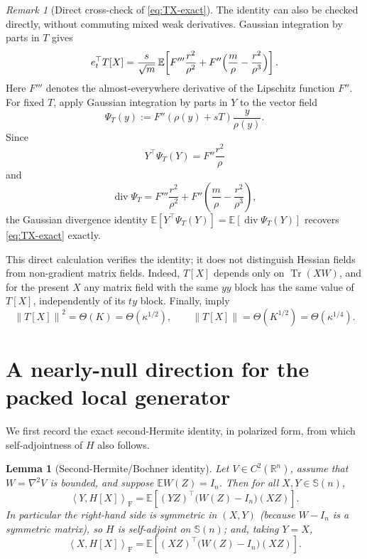 \documentclass[11pt]{article}
\theoremstyle{plain}
\newtheorem{lemma}[theorem]{Lemma}
\theoremstyle{definition}
\theoremstyle{remark}
\newtheorem{remark}[theorem]{Remark}
\newcommand{\R}{\mathbb{R}}
\newcommand{\E}{\mathbb{E}}
\newcommand{\Sym}{\mathbb{S}}
\newcommand{\Tr}{\operatorname{Tr}}
\newcommand{\Id}{I}
\newcommand{\1}{\mathbf{1}}
\newcommand{\norm}[1]{\left\lVert #1\right\rVert}
\newcommand{\inner}[2]{\left\langle #1,#2\right\rangle}
\begin{document}
\begin{remark}[Direct cross-check of \eqref{eq:TX-exact}]
\label{rem:crosscheck}
The identity can also be checked directly, without commuting mixed weak
derivatives. Gaussian integration by parts in $T$ gives
\[
    e_t^\top T[X]
    =\frac{s}{\sqrt m}\,
    \E\!\left[F'''\frac{r^2}{\rho^2}
        +F''\Bigl(\frac m\rho-\frac{r^2}{\rho^3}\Bigr)\right].
\]
Here $F'''$ denotes the almost-everywhere derivative of the Lipschitz
function $F''$. For fixed $T$, apply Gaussian integration by parts in $Y$
to the vector field
\[
    \Psi_T(y)
    :=
    F''(\rho(y)+sT)\frac{y}{\rho(y)}.
\]
Since
\[
    Y^\top\Psi_T(Y)=F''\frac{r^2}{\rho}
\]
and
\[
    \operatorname{div}\Psi_T
    =
    F'''\frac{r^2}{\rho^2}
    +
    F''\left(\frac m\rho-\frac{r^2}{\rho^3}\right),
\]
the Gaussian divergence identity
$\E[Y^\top\Psi_T(Y)]=\E[\operatorname{div}\Psi_T(Y)]$ recovers
\eqref{eq:TX-exact} exactly.

This direct calculation verifies the identity; it does not distinguish
Hessian fields from non-gradient matrix fields. Indeed, $T[X]$ depends only
on $\Tr(XW)$, and for the present $X$ any matrix field with the same $yy$
block has the same value of $T[X]$, independently of its $ty$ block. Finally,
 imply
\[
    \norm{T[X]}^2=\Theta(K)=\Theta(\kappa^{1/2}),
    \qquad
    \norm{T[X]}=\Theta(K^{1/2})=\Theta(\kappa^{1/4}).
\]
\end{remark}

\section{A nearly-null direction for the packed local generator}
\label{sec:gap}

We first record the exact second-Hermite identity, in polarized form, from
which self-adjointness of $H$ also follows.

\begin{lemma}[Second-Hermite/Bochner identity]
\label{lem:second-Hermite}
Let $V\in C^2(\R^n)$, assume that $W=\nabla^2V$ is bounded, and suppose
$\E W(Z)=\Id_n$. Then for all $X,Y\in\Sym(n)$,
\begin{equation}
    \inner{Y}{H[X]}_{\mathrm F}
    =
    \E\!\left[
        (YZ)^\top\bigl(W(Z)-\Id_n\bigr)(XZ)
    \right].
    \label{eq:second-Hermite-id}
\end{equation}
In particular the right-hand side is symmetric in $(X,Y)$ (because $W-\Id_n$
is a symmetric matrix), so $H$ is self-adjoint on $\Sym(n)$; and, taking
$Y=X$,
\begin{equation}
    \inner{X}{H[X]}_{\mathrm F}
    =
    \E\!\left[
        (XZ)^\top\bigl(W(Z)-\Id_n\bigr)(XZ)
    \right].
    \label{eq:second-Hermite-quad}
\end{equation}
\end{lemma}
\end{document}
